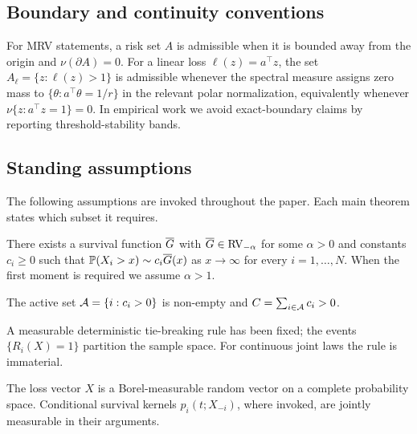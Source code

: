 \subsection{Boundary and continuity conventions}

For MRV statements, a risk set \(A\) is admissible when it is bounded away from
the origin and \(\nu(\partial A)=0\). For a linear loss \(\ell(z)=a^\top z\),
the set \(A_\ell=\{z:\ell(z)>1\}\) is admissible whenever the spectral measure
assigns zero mass to \(\{\theta:a^\top\theta=1/r\}\) in the relevant polar
normalization, equivalently whenever \(\nu\{z:a^\top z=1\}=0\). In empirical
work we avoid exact-boundary claims by reporting threshold-stability bands.

\subsection{Standing assumptions}
\label{subsec:standing-assumptions}

The following assumptions are invoked throughout the paper. Each main theorem
states which subset it requires.

\begin{assumption}
\label{ass:rv-common-ref}
There exists a survival function \(\overline{G}\) with \(\overline{G}\in\mathrm{RV}_{-\alpha}\) for some
\(\alpha>0\) and constants \(c_i\ge 0\) such that
\(\mathbb{P}(X_i>x)\sim c_i\overline{G}(x)\) as \(x\to\infty\) for every \(i=1,\ldots,N\). When
the first moment is required we assume \(\alpha>1\).
\end{assumption}

\begin{assumption}
\label{ass:active-nonempty}
The active set \(\mathcal{A}=\{i:c_i>0\}\) is non-empty and \(C=\sum_{i\in\mathcal{A}}c_i>0\).
\end{assumption}

\begin{assumption}
\label{ass:tie}
A measurable deterministic tie-breaking rule has been fixed; the events
\(\{R_i(X)=1\}\) partition the sample space. For continuous joint laws the rule
is immaterial.
\end{assumption}

\begin{assumption}
\label{ass:measurability}
The loss vector \(X\) is a Borel-measurable random vector on a complete
probability space. Conditional survival kernels \(p_i(t;X_{-i})\), where
invoked, are jointly measurable in their arguments.
\end{assumption}

